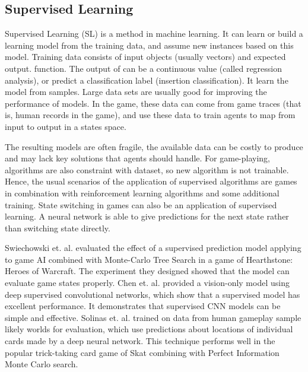 \documentclass[11pt,en]{elegantpaper}
\begin{document}
\subsection{Supervised Learning}
Supervised Learning (SL) is a method in machine learning. It can learn or build a learning model from the training data, and assume new instances based on this model. Training data consists of input objects (usually vectors) and expected output. function. The output of can be a continuous value (called regression analysis), or predict a classification label (insertion classification). It learn the model from samples. Large data sets are usually good for improving the performance of models. In the game, these data can come from game traces (that is, human records in the game), and use these data to train agents to map from input to output in a states space.

The resulting models are often fragile, the available data can be costly to produce and may lack key solutions that agents should handle. For game-playing, algorithms are also constraint with dataset, so new algorithm is not trainable. Hence, the usual scenarios of the application of supervised algorithms are games in combination with reinforcement learning algorithms and some additional training. State switching in games can also be an application of supervised learning. A neural network is able to give predictions for the next state rather than switching state directly.

Swiechowski et. al. \cite{a1} evaluated the effect of a supervised prediction model applying to game AI combined with Monte-Carlo Tree Search in a game of Hearthstone: Heroes of Warcraft. The experiment they designed showed that the model can evaluate game states properly. Chen et. al. \cite{a2} provided a vision-only model using deep supervised convolutional networks, which show that a supervised model has excellent performance. It demonstrates that supervised CNN models can be simple and effective. Solinas et. al. \cite{a3} trained on data from human gameplay sample likely worlds for evaluation, which use predictions about locations of individual cards made by a deep neural network. This technique performs well in the popular trick-taking card game of Skat combining with Perfect Information Monte Carlo search.
\end{document}
